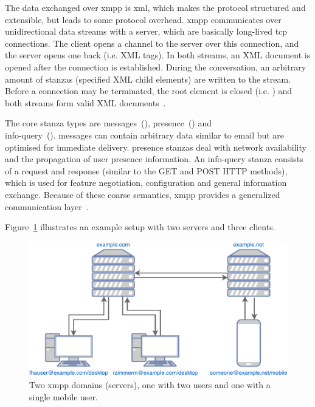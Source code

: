 The data exchanged over \gls{xmpp} is \gls{xml}, which makes the protocol structured and extensible, but leads to some protocol overhead.
\gls{xmpp} communicates over unidirectional data streams with a server, which are basically long-lived \gls{tcp} connections.
The client opens a channel to the server over this connection, and the server opens one back (i.e.  XML tags). In both streams, an XML document is opened after the connection is established.
During the conversation, an arbitrary amount of \glspl{stanza} (specified XML child elements) are written to the stream.
Before a connection may be terminated, the root element is closed (i.e. ) and both streams form valid XML documents~\cite{rfc6120}\cite{professional-xmpp}.

The core \gls{stanza} types are \glspl{message}~(), \gls{presence}~() and\\
\gls{info-query}~().
\Glspl{message} can contain arbitrary data similar to email but are optimised for immediate delivery.
\Gls{presence} \glspl{stanza} deal with network availability and the propagation of user presence information.
An \gls{info-query} \gls{stanza} consists of a request and response (similar to the GET and POST HTTP methods), which is used for feature negotiation, configuration and general information exchange.
Because of these coarse semantics, \gls{xmpp} provides a generalized communication layer~\cite{rfc6120}\cite{ieee-xplore-stream-xml-xmpp}.

Figure~\ref{fig:xmpp-overview} illustrates an example setup with two servers and three clients.

\begin{figure}[h]
	\centering
	\includegraphics[width=0.8\linewidth]{resources/xmpp_overview.pdf}
	\caption{Two \gls{xmpp} domains (servers), one with two users and one with a single mobile user.}
	\label{fig:xmpp-overview}
\end{figure}

